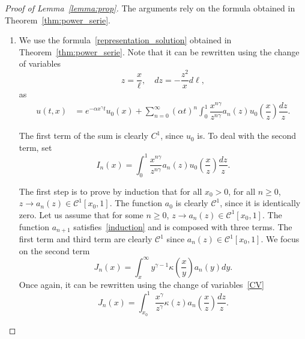 \documentclass[AHL,Unicode,longabstracts,published]{cedram}
\newcommand*\dst{\displaystyle}
\renewcommand*\a{\alpha}
\newcommand{\clC}{\mathcal{C}}
\begin{document}
\begin{proof}[Proof of Lemma~\ref{lemma:prop}]
The arguments rely on the formula obtained in Theorem~\ref{thm:power_serie}.
\begin{enumerate}
\item We use the formula~\eqref{representation_solution} obtained in Theorem~\ref{thm:power_serie}. Note that it can be rewritten using the change of variables
\begin{equation}\label{CV}
z=\dfrac{x}{\ell}, \quad dz= -\dfrac{z^2}{x}d\ell,
\end{equation}
as
\begin{equation}\label{name}
\begin{aligned}
u(t,x) &= e^{-\a x^{\gamma}t} u_0(x) + \sum_{n=0}^{\infty} (\a t)^n
\dst\int_0^{1} \dfrac{x^{n\gamma}}{z^{n\gamma}} a_n(z) u_0\left(\dfrac{x}{z}\right) \dfrac{dz}{z}.
\end{aligned}
\end{equation}

The first term of the sum is clearly $C^1$, since $u_0$ is. To deal with the second term, set
\begin{equation*}
I_n(x)= \dst\int_0^{1} \dfrac{x^{n\gamma}}{z^{n\gamma}} a_n(z) u_0\left(\dfrac{x}{z}\right) \dfrac{dz}{z}.
\end{equation*}

The first step is to prove by induction that for all $x_0>0$, for all $n\geq 0$, $z\to a_n(z) \in \clC^1[x_0,1]$. The function $a_0$ is clearly $ \clC^1$, since it is identically zero. Let us assume that for some $n\geq 0$, $z\to a_n(z) \in \clC^1[x_0,1]$. The function $a_{n+1}$ satisfies~\eqref{induction} and is composed with three terms. The first term and third term are clearly $\clC^1$ since $a_n(z) \in \clC^1[x_0,1]$. We focus on the second term
\begin{equation*}
J_n(x)= \dst\int_x^{\infty} y^{\gamma-1} \kappa \left(\dfrac{x}{y} \right)a_n(y)dy.
\end{equation*}
Once again, it can be rewritten using the change of variables~\eqref{CV}
\begin{equation*}
J_n(x)=\dst\int_{x_0}^{1} \dfrac{x^{\gamma}}{z^{\gamma}} \kappa(z) a_n\left(\dfrac{x}{z}\right) \dfrac{dz}{z}.
\end{equation*}


\end{enumerate}
\end{proof}
\end{document}
